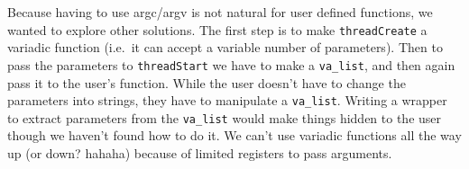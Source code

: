 \documentclass[a4paper,11pt,english]{article}
\begin{document}
Because having to use argc/argv is not natural for user defined functions, we
wanted to explore other solutions. The first step is to make
\texttt{threadCreate} a variadic function (i.e.\ it can accept a variable number
of parameters). Then to pass the parameters to \texttt{threadStart} we have to
make a \texttt{va\_list}, and then again pass it to the user's function. While
the user doesn't have to change the parameters into strings, they have to
manipulate a \texttt{va\_list}. Writing a wrapper to extract parameters from the
\texttt{va\_list} would make things hidden to the user though we haven't found
how to do it. We can't use variadic functions all the way up (or down? hahaha)
because of limited registers to pass arguments.
\end{document}
